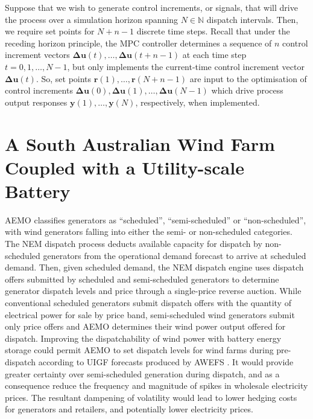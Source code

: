 \documentclass[a4paper, 10pt, twocolumn, preprint, 3p]{elsarticle}
\def\N{\mathbb{N}}
\begin{document}
Suppose that we wish to generate control increments, or signals, that will drive the process over a simulation horizon spanning ${N\in\N}$ dispatch intervals.  Then, we require set points for $N\!+\!n\!-\!1$ discrete time steps.  Recall that under the receding horizon principle, the MPC controller determines a sequence of $n$ control increment vectors ${\boldsymbol{\Delta{u}}(t), \ldots, \boldsymbol{\Delta{u}}(t\!+\!n\!-\!1)}$ at each time step ${t = 0, 1, \ldots, N\!-\!1}$, but only implements the current-time control increment vector $\boldsymbol{\Delta{u}}(t)$.  So, set points ${\boldsymbol{r}(1), \ldots, \boldsymbol{r}(N\!+\!n\!-\!1)}$ are input to the optimisation of control increments ${\boldsymbol{\Delta{u}}(0), \boldsymbol{\Delta{u}}(1), \ldots, \boldsymbol{\Delta{u}}(N\!-\!1)}$ which drive process output responses ${\boldsymbol{y}(1), \ldots, \boldsymbol{y}(N)}$, respectively, when implemented. 

\section{A South Australian Wind Farm Coupled with a Utility-scale Battery}\label{sect:sa_wind_bess}
AEMO classifies generators as ``scheduled'', ``semi-scheduled'' or ``non-scheduled'', with wind generators falling into either the semi- or non-scheduled categories.  The NEM dispatch process deducts available capacity for dispatch by non-scheduled generators from the operational demand forecast to arrive at scheduled demand.  Then, given scheduled demand, the NEM dispatch engine uses dispatch offers submitted by scheduled and semi-scheduled generators to determine generator dispatch levels and price through a single-price reverse auction.  While conventional scheduled generators submit dispatch offers with the quantity of electrical power for sale by price band, semi-scheduled wind generators submit only price offers and AEMO determines their wind power output offered for dispatch.  Improving the dispatchability of wind power with battery energy storage could permit AEMO to set dispatch levels for wind farms during pre-dispatch according to UIGF forecasts produced by AWEFS \citep{AEMO16b}.  It would provide greater certainty over semi-scheduled generation during dispatch, and as a consequence reduce the frequency and magnitude of spikes in wholesale electricity prices.  The resultant dampening of volatility would lead to lower hedging costs for generators and retailers, and potentially lower electricity prices.
\end{document}
